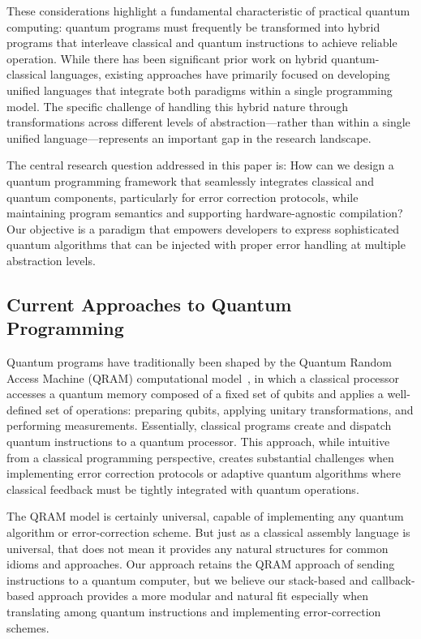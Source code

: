 These considerations highlight a fundamental characteristic of practical quantum computing: quantum programs must frequently be transformed into hybrid programs that interleave classical and quantum instructions to achieve reliable operation. While there has been significant prior work on hybrid quantum-classical languages, existing approaches have primarily focused on developing unified languages that integrate both paradigms within a single programming model. The specific challenge of handling this hybrid nature through transformations across different levels of abstraction—rather than within a single unified language—represents an important gap in the research landscape.

The central research question addressed in this paper is: How can we design a quantum programming framework that seamlessly integrates classical and quantum components, particularly for error correction protocols, while maintaining program semantics and supporting hardware-agnostic compilation? Our objective is a paradigm that empowers developers to express sophisticated quantum algorithms that can be injected with proper error handling at multiple abstraction levels.

\subsection{Current Approaches to Quantum Programming}

Quantum programs have traditionally been shaped by the Quantum Random Access Machine (QRAM) computational model~\cite{knill2022conventions}, in which a classical processor accesses a quantum memory composed of a fixed set of qubits and applies a well-defined set of operations: preparing qubits, applying unitary transformations, and performing measurements. Essentially, classical programs create and dispatch quantum instructions to a quantum processor. This approach, while intuitive from a classical programming perspective, creates substantial challenges when implementing error correction protocols or adaptive quantum algorithms where classical feedback must be tightly integrated with quantum operations.

The QRAM model is certainly universal, capable of implementing any quantum algorithm or error-correction scheme. But just as a classical assembly language is universal, that does not mean it provides any natural structures for common idioms and approaches. 
Our approach retains the QRAM approach of sending instructions to a quantum computer, but 
we believe our stack-based and callback-based approach provides a more modular and natural fit especially when translating among quantum instructions and implementing error-correction schemes. 

